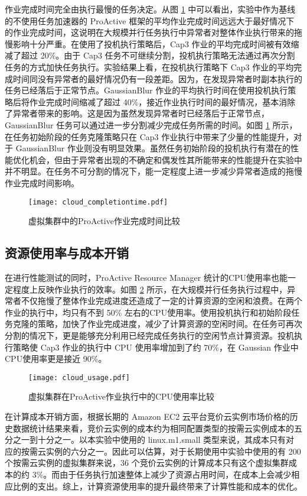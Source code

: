 作业完成时间完全由执行最慢的任务决定。从图 \ref{figure:completiontime_cloud} 中可以看出，实验中作为基线的不使用任务加速器的 ProActive 框架的平均作业完成时间远远大于最好情况下的作业完成时间，这说明在大规模并行任务执行中异常者对整体作业执行带来的拖慢影响十分严重。在使用了投机执行策略后，Cap3 作业的平均完成时间被有效缩减了超过 20\%。由于 Cap3 任务不可继续分割，投机执行策略无法通过再次分割任务的方式加快任务执行。实验结果上看，在投机执行策略下 Cap3 作业的平均完成时间同没有异常者的最好情况仍有一段差距。因为，在发现异常者时副本执行的任务已经落后于正常节点。GaussianBlur 作业的平均执行时间在使用投机执行策略后将作业完成时间缩减了超过 40\%，接近作业执行时间的最好情况，基本消除了异常者带来的影响。这是因为虽然发现异常者时已经落后于正常节点，GaussianBlur 任务可以通过进一步分割减少完成任务所需的时间。如图 \ref{figure:completiontime_cloud} 所示，在任务初始阶段的任务克隆策略只在 Cap3 作业执行中带来了少量的性能提升，对于 GaussianBlur 作业则没有明显效果。虽然任务初始阶段的投机执行有潜在的性能优化机会，但由于异常者出现的不确定和偶发性其所能带来的性能提升在实验中并不明显。在任务不可分割的情况下，能一定程度上进一步减少异常者造成的拖慢作业完成时间影响。
\begin{figure}
  \centering
  \texttt{[image: cloud\_completiontime.pdf]}
  \caption{虚拟集群中的ProActive作业完成时间比较}
  \label{figure:completiontime_cloud}
\end{figure}

\subsection{资源使用率与成本开销}
\label{sec:no2_usage}
在进行性能测试的同时，ProActive Resource Manager 统计的CPU使用率也能一定程度上反映作业执行的效率。如图 \ref{figure:resourceusage_cloud} 所示，在大规模并行任务执行过程中，异常者不仅拖慢了整体作业完成进度还造成了一定的计算资源的空闲和浪费。在两个作业的执行中，均只有不到 50\% 左右的CPU使用率。使用投机执行和初始阶段任务克隆的策略，加快了作业完成进度，减少了计算资源的空闲时间。在任务可再次分割的情况下，更是能够充分利用已经完成任务执行的空闲节点计算资源。投机执行策略使 Cap3 作业的执行中 CPU 使用率增加到了约 70\%，在 Gaussian 作业中CPU使用率更是接近 90\%。
\begin{figure}
  \centering
  \texttt{[image: cloud\_usage.pdf]}
  \caption{虚拟集群在ProActive作业执行中的CPU使用率比较}
  \label{figure:resourceusage_cloud}
\end{figure}

在计算成本开销方面，根据长期的 Amazon EC2 云平台竞价云实例市场价格的历史数据统计结果来看，竞价云实例的成本约为相同配置类型的按需云实例成本的五分之一到十分之一。以本实验中使用的 linux.m1.small 类型来说，其成本只有对应的按需云实例的六分之一。因此可以估算，对于长期使用中实验中使用的有 200 个按需云实例的虚拟集群来说，36 个竞价云实例的计算成本只有这个虚拟集群成本的约 3\%。而由于任务执行加速整体上减少了资源占用时间，在成本上会减少相应比例的支出。综上，计算资源使用率的提升最终带来了计算性能和成本的优化。

